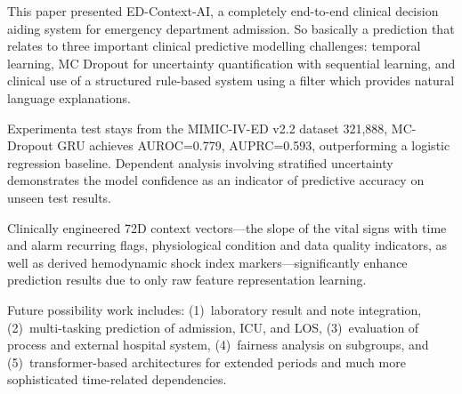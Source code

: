 \documentclass[conference]{IEEEtran}
\begin{document}
This paper presented ED-Context-AI, a completely end-to-end clinical decision aiding system for emergency department admission. So basically a prediction that relates to three important clinical predictive modelling challenges: temporal learning, MC Dropout for uncertainty quantification with sequential learning, and clinical use of a structured rule-based system using a filter which provides natural language explanations.

Experimenta test stays from the MIMIC-IV-ED v2.2 dataset 321,888, MC-Dropout GRU achieves AUROC=0.779, AUPRC=0.593, outperforming a logistic regression baseline. Dependent analysis involving stratified uncertainty demonstrates the model confidence as an indicator of predictive accuracy on unseen test results.

Clinically engineered 72D context vectors---the slope of the vital signs with time and alarm recurring flags, physiological condition and data quality indicators, as well as derived hemodynamic shock index markers---significantly enhance prediction results due to only raw feature representation learning.

Future possibility work includes: (1)~laboratory result and note integration, (2)~multi-tasking prediction of admission, ICU, and LOS, (3)~evaluation of process and external hospital system, (4)~fairness analysis on subgroups, and (5)~transformer-based architectures for extended periods and much more sophisticated time-related dependencies.
\end{document}
